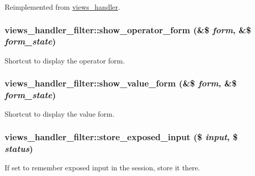 Reimplemented from \hyperlink{classviews__handler_af519db20125fb4d1c0f7401692dcef0c}{views\_\-handler}.\hypertarget{classviews__handler__filter_ad24ef0dda8c7441b9b471aec9052a0a5}{
\subsubsection[{show\_\-operator\_\-form}]{\setlength{\rightskip}{0pt plus 5cm}views\_\-handler\_\-filter::show\_\-operator\_\-form (\&\$ {\em form}, \/  \&\$ {\em form\_\-state})}}
\label{classviews__handler__filter_ad24ef0dda8c7441b9b471aec9052a0a5}
Shortcut to display the operator form. \hypertarget{classviews__handler__filter_a37f4961abdb70886be8229fbfa35038a}{
\subsubsection[{show\_\-value\_\-form}]{\setlength{\rightskip}{0pt plus 5cm}views\_\-handler\_\-filter::show\_\-value\_\-form (\&\$ {\em form}, \/  \&\$ {\em form\_\-state})}}
\label{classviews__handler__filter_a37f4961abdb70886be8229fbfa35038a}
Shortcut to display the value form. \hypertarget{classviews__handler__filter_a7ad1d1cd56293ca452be9e7d5cfd8b94}{
\subsubsection[{store\_\-exposed\_\-input}]{\setlength{\rightskip}{0pt plus 5cm}views\_\-handler\_\-filter::store\_\-exposed\_\-input (\$ {\em input}, \/  \$ {\em status})}}
\label{classviews__handler__filter_a7ad1d1cd56293ca452be9e7d5cfd8b94}
If set to remember exposed input in the session, store it there. 

